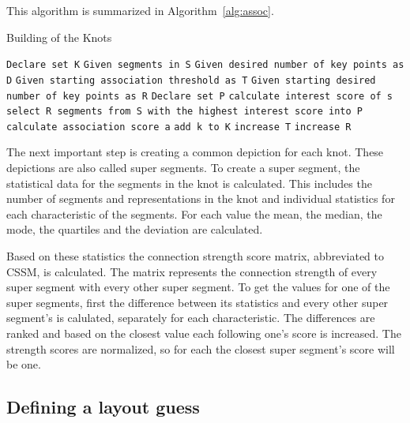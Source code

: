 This algorithm is summarized in Algorithm~\ref{alg:assoc}.

\begin{algorithm}
\caption{Building of the Knots}\label{alg:assoc}
\begin{algorithmic}
\State \texttt{Declare set K}
\State \texttt{Given segments in S}
\State \texttt{Given desired number of key points as D}
\State \texttt{Given starting association threshold as T}
\State \texttt{Given starting desired number of key points as R}
    \State \texttt{Declare set P}
        \State \texttt{calculate interest score of s}
    \EndFor
    \State \texttt{select R segments from S with the highest interest score into P}
            \State \texttt{calculate association score a}
            \EndIf
        \EndFor
        \State \texttt{add k to K}
    \EndFor
    \State \texttt{increase T}
    \State \texttt{increase R}
\EndWhile
\end{algorithmic}
\end{algorithm}

The next important step is creating a common depiction for each knot. These depictions are also called super segments. To create a super segment, the statistical data for the segments in the knot is calculated. This includes the number of segments and representations in the knot and individual statistics for each characteristic of the segments. For each value the mean, the median, the mode, the quartiles and the deviation are calculated.

Based on these statistics the connection strength score matrix, abbreviated to CSSM, is calculated. The matrix represents the connection strength of every super segment with every other super segment. To get the values for one of the super segments, first the difference between its statistics and every other super segment's is calulated, separately for each characteristic. The differences are ranked and based on the closest value each following one's score is increased. The strength scores are normalized, so for each the closest super segment's score will be one.

\subsection{Defining a layout guess} %

